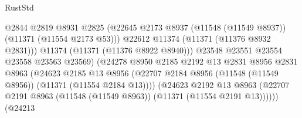 \begin{lexlean}{RustStd}
\begin{coremodule}
                                              @2844
                                              @2819
                                              @8931
                                              @2825
                                              (@22645
                                                @2173
                                                @8937
                                                (@11548 (@11549 @8937))
                                                (@11371 (@11554 @2173 @53)))
                                              @22612
                                              @11374
                                              (@11371 (@11376 @8932 @2831)))
                                            @11374
                                            (@11371 (@11376 @8922 @8940)))
                                          @23548
                                          @23551
                                          @23554
                                          @23558
                                          @23563
                                          @23569)
                                        (@24278
                                          @8950
                                          @2185
                                          @2192
                                          @13
                                          @2831
                                          @8956
                                          @2831
                                          @8963
                                          (@24623
                                            @2185
                                            @13
                                            @8956
                                            (@22707
                                              @2184
                                              @8956
                                              (@11548 (@11549 @8956))
                                              (@11371 (@11554 @2184 @13))))
                                          (@24623
                                            @2192
                                            @13
                                            @8963
                                            (@22707
                                              @2191
                                              @8963
                                              (@11548 (@11549 @8963))
                                              (@11371 (@11554 @2191 @13))))))
                                      (@24213

\end{coremodule}
\end{lexlean}
